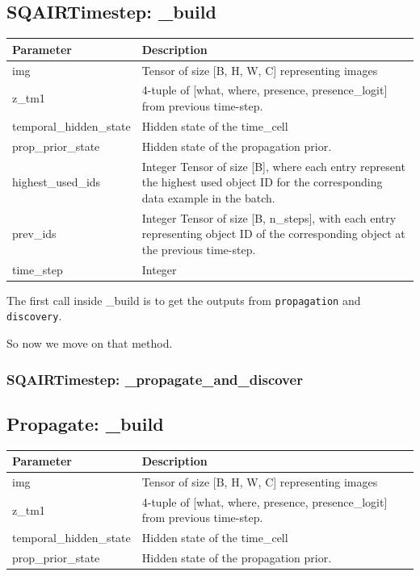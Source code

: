 \documentclass{article}
\begin{document}
\subsection{SQAIRTimestep: \_build}


\begin{center}
\begin{tabular}{ | m{10em} | m{12cm}| } 
\hline
Parameter& Description \\ 
\hline
 img & Tensor of size [B, H, W, C] representing images \\ 
\hline
 z\_tm1 &   4-tuple of [what, where, presence, presence\_logit] from previous time-step.\\ 
\hline
temporal\_hidden\_state & Hidden state of the time\_cell \\
\hline
prop\_prior\_state & Hidden state of the propagation prior. \\
\hline
highest\_used\_ids & Integer Tensor of size [B], where each entry represent the highest used object
            ID for the corresponding data example in the batch. \\
\hline
prev\_ids & Integer Tensor of size [B, n\_steps], with each entry representing object ID of the
            corresponding object at the previous time-step. \\
\hline
time\_step & Integer \\
\hline
\hline
\hline
\end{tabular}
\end{center}

The first call inside \_build is to get the outputs from \texttt{propagation} and \texttt{discovery}. 

So now we move on that method.

\subsubsection{SQAIRTimestep: \_propagate\_and\_discover}


\subsection{Propagate: \_build}
\begin{center}
\begin{tabular}{ | m{10em} | m{12cm}| } 
\hline
Parameter& Description \\ 
\hline
 img & Tensor of size [B, H, W, C] representing images \\ 
\hline
 z\_tm1 &   4-tuple of [what, where, presence, presence\_logit] from previous time-step.\\ 
\hline
temporal\_hidden\_state & Hidden state of the time\_cell \\
\hline
prop\_prior\_state & Hidden state of the propagation prior. \\
\hline
\end{tabular}
\end{center}
\end{document}
